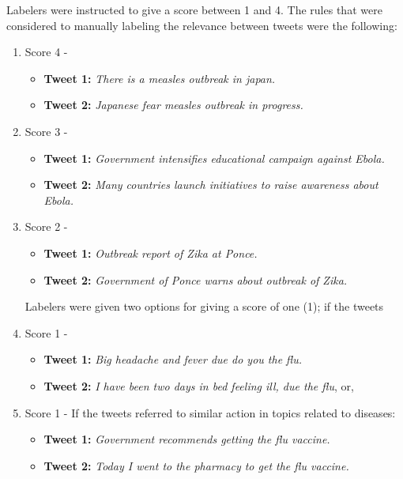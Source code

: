 \documentclass[12pt]{report}
\begin{document}
Labelers were instructed to give a score between 1 and 4. The rules that were considered to manually labeling the relevance between tweets were the following:

\begin{enumerate}
	\item Score 4 - 
	\begin{itemize}
		\item \textbf{Tweet 1:} \textit{There is a measles outbreak in japan.}
		\item \textbf{Tweet 2:} \textit{Japanese fear measles outbreak in progress.}
	\end{itemize}

	\item Score 3 - 
	\begin{itemize}
		\item \textbf{Tweet 1:} \textit{Government intensifies educational campaign against Ebola.}
		\item \textbf{Tweet 2:} \textit{Many countries launch initiatives to raise awareness about Ebola.}
	\end{itemize}

	\item Score 2 - 
	\begin{itemize}
		\item \textbf{Tweet 1:} \textit{Outbreak report of Zika at Ponce.}
		\item \textbf{Tweet 2:} \textit{Government of Ponce warns about outbreak of Zika.}
	\end{itemize}
	
	\noindent Labelers were given two options for giving a score of one (1); if the tweets 

	\item Score  1 - 
	\begin{itemize}
		\item \textbf{Tweet 1:} \textit{Big headache and fever due do you the flu.}
		\item \textbf{Tweet 2:} \textit{I have been two days in bed feeling ill, due the flu}, or, 
	\end{itemize}
	
	\item Score  1 - If the tweets referred to similar action in topics related to diseases:
	\begin{itemize}
		\item \textbf{Tweet 1:} \textit{Government recommends getting the flu vaccine.}
		\item \textbf{Tweet 2:} \textit{Today I went to the pharmacy to get the flu vaccine.}
	\end{itemize}
\end{enumerate}
\end{document}
